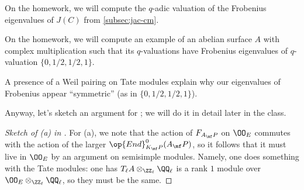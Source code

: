 \documentclass[../notes.tex]{subfiles}
\begin{document}
\begin{remark}
	On the homework, we will compute the $q$-adic valuation of the Frobenius eigenvalues of $J(C)$ from \cref{subsec:jac-cm}.
\end{remark}
\begin{remark}
	On the homework, we will compute an example of an abelian surface $A$ with complex multiplication such that its $q$-valuations have Frobenius eigenvalues of $q$-valuation $\{0,1/2,1/2,1\}$.
\end{remark}
\begin{remark}
	A presence of a Weil pairing on Tate modules explain why our eigenvalues of Frobenius appear ``symmetric'' (as in $\{0,1/2,1/2,1\}$).
\end{remark}
Anyway, let's sketch an argument for ; we will do it in detail later in the class.
\begin{proof}[Sketch of (a) in ]
	For (a), we note that the action of $F_{A_\mf P}$ on $\OO_E$ commutes with the action of the larger $\op{End}^0_{K_\mf P}(A_\mf P)$, so it follows that it must live in $\OO_E$ by an argument on semisimple modules. Namely, one does something with the Tate modules: one has $T_\ell A\otimes_{\ZZ_\ell}\QQ_\ell$ is a rank $1$ module over $\OO_E\otimes_{\ZZ_\ell}\QQ_\ell$, so they must be the same.
\end{proof}
\end{document}
